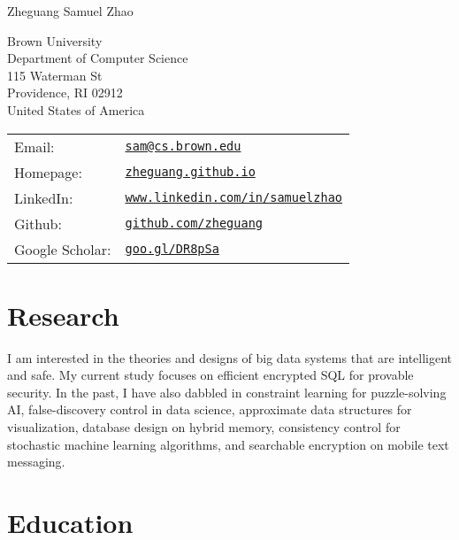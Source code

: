 \documentclass[letterpaper]{article}
\def\name{Zheguang Samuel Zhao}
\begin{document}
{\huge \name}


\vspace{0.25in}

\begin{minipage}{0.45\linewidth}
  Brown University \\
  Department of Computer Science \\
  115 Waterman St \\
  Providence, RI 02912 \\
  United States of America
\end{minipage}
\begin{minipage}{0.45\linewidth}
  \begin{tabular}{ll}
    Email: & \href{mailto:sam@cs.brown.edu}{\tt sam@cs.brown.edu} \\
    Homepage: & \href{https://zheguang.github.io}{\tt zheguang.github.io} \\
    LinkedIn: & \href{https://www.linkedin.com/in/samuelzhao}{\tt www.linkedin.com/in/samuelzhao} \\
    Github: & \href{https://github.com/zheguang}{\tt github.com/zheguang} \\
    Google Scholar: & \href{https://goo.gl/DR8pSa}{\tt goo.gl/DR8pSa} \\
  \end{tabular}
\end{minipage}


\section*{Research}

I am interested in the theories and designs of big data systems that are intelligent and safe.  My current study focuses on efficient encrypted SQL for provable security.  In the past, I have also dabbled in constraint learning for puzzle-solving AI, false-discovery control in data science, approximate data structures for visualization, database design on hybrid memory, consistency control for stochastic machine learning algorithms, and searchable encryption on mobile text messaging. 

\section*{Education}
\end{document}
